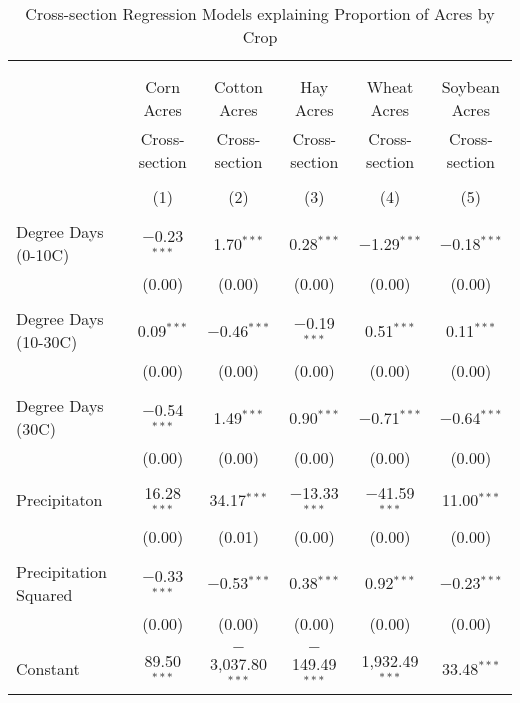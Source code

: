 \documentclass[10pt]{article}
\begin{document}
\begin{table}[!htbp] \centering 
  \caption{Cross-section Regression Models explaining Proportion of Acres by Crop} 
  \label{} 
\footnotesize 
\begin{tabular}{@{\extracolsep{5pt}}lccccc} 
\\[-1.8ex]\hline 
\hline \\[-1.8ex] 
\\[-1.8ex] & Corn Acres & Cotton Acres & Hay Acres & Wheat Acres & Soybean Acres \\ 
 & Cross-section & Cross-section & Cross-section & Cross-section & Cross-section \\ 
\\[-1.8ex] & (1) & (2) & (3) & (4) & (5)\\ 
\hline \\[-1.8ex] 
 Degree Days (0-10C) & $-$0.23$^{***}$ & 1.70$^{***}$ & 0.28$^{***}$ & $-$1.29$^{***}$ & $-$0.18$^{***}$ \\ 
  & (0.00) & (0.00) & (0.00) & (0.00) & (0.00) \\ 
  & & & & & \\ 
 Degree Days (10-30C) & 0.09$^{***}$ & $-$0.46$^{***}$ & $-$0.19$^{***}$ & 0.51$^{***}$ & 0.11$^{***}$ \\ 
  & (0.00) & (0.00) & (0.00) & (0.00) & (0.00) \\ 
  & & & & & \\ 
 Degree Days (30C) & $-$0.54$^{***}$ & 1.49$^{***}$ & 0.90$^{***}$ & $-$0.71$^{***}$ & $-$0.64$^{***}$ \\ 
  & (0.00) & (0.00) & (0.00) & (0.00) & (0.00) \\ 
  & & & & & \\ 
 Precipitaton & 16.28$^{***}$ & 34.17$^{***}$ & $-$13.33$^{***}$ & $-$41.59$^{***}$ & 11.00$^{***}$ \\ 
  & (0.00) & (0.01) & (0.00) & (0.00) & (0.00) \\ 
  & & & & & \\ 
 Precipitation Squared & $-$0.33$^{***}$ & $-$0.53$^{***}$ & 0.38$^{***}$ & 0.92$^{***}$ & $-$0.23$^{***}$ \\ 
  & (0.00) & (0.00) & (0.00) & (0.00) & (0.00) \\ 
  & & & & & \\ 
 Constant & 89.50$^{***}$ & $-$3,037.80$^{***}$ & $-$149.49$^{***}$ & 1,932.49$^{***}$ & 33.48$^{***}$ \\ 

\end{tabular}
\end{table}
\end{document}
